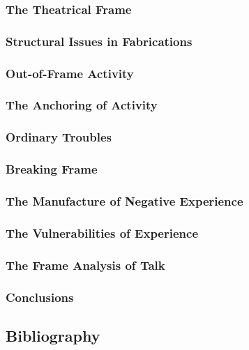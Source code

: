 \documentclass[11pt]{article}
\begin{document}
\subsubsection{The Theatrical Frame}
\label{sec-1.2.5}

\subsubsection{Structural Issues in Fabrications}
\label{sec-1.2.6}

\subsubsection{Out-of-Frame Activity}
\label{sec-1.2.7}

\subsubsection{The Anchoring of Activity}
\label{sec-1.2.8}

\subsubsection{Ordinary Troubles}
\label{sec-1.2.9}

\subsubsection{Breaking Frame}
\label{sec-1.2.10}

\subsubsection{The Manufacture of Negative Experience}
\label{sec-1.2.11}

\subsubsection{The Vulnerabilities of Experience}
\label{sec-1.2.12}

\subsubsection{The Frame Analysis of Talk}
\label{sec-1.2.13}

\subsubsection{Conclusions}
\label{sec-1.2.14}

\subsection{Bibliography}
\label{sec-1.3}
\end{document}
